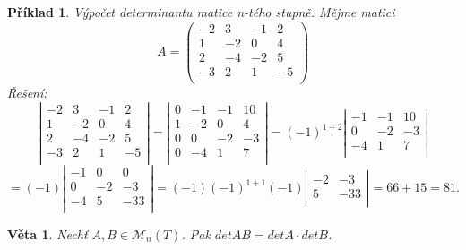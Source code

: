 \documentclass[12pt,a4paper]{article}
\newtheorem{sentence}{Věta}
\newtheorem{example}{Příklad}
\begin{document}
\begin{example}
	Výpočet determinantu matice n-tého stupně. Mějme matici $$A = \left( \begin{array}{cccc} -2 & 3 & -1 & 2\\ 1 & -2 & 0 & 4\\ 2 & -4 & -2 & 5\\ -3 & 2 & 1 & -5\\ \end{array} \right)$$
	Řešení: 
	\begin{displaymath}
		\left| 
		\begin{array}{cccc}
			-2 & 3 & -1 & 2\\ 
			1 & -2 & 0 & 4\\ 
			2 & -4 & -2 & 5\\ 
			-3 & 2 & 1 & -5\\
		\end{array} \right| = 
		\left| 
		\begin{array}{cccc}
			0 & -1 & -1 & 10\\ 
			1 & -2 & 0 & 4\\ 
			0 & 0 & -2 & -3\\ 
			0 & -4 & 1 & 7\\
		\end{array}\right| = (-1)^{1+2}
		\left| 
		\begin{array}{ccc}
			 -1 & -1 & 10\\ 
			 0 & -2 & -3\\ 
			 -4 & 1 & 7\\
		\end{array}\right| 
		\end{displaymath}
		\begin{displaymath}
		= (-1)
		\left| 
		\begin{array}{ccc}
			 -1 & 0 & 0 \\ 
			0 & -2 & -3 \\ 
			-4 & 5 & -33 \\ 
		\end{array}\right| = (-1)(-1)^{1+1}(-1) 
		\left| 
		\begin{array}{cc}
			 -2 & -3 \\ 
			 5 & -33 \\  
		\end{array}\right| = 66 + 15 = 81.
	\end{displaymath}
	
\end{example}

\begin{sentence}
	Nechť $A,B \in \mathscr{M}_n(T)$. Pak $detAB = detA \cdot detB$.
\end{sentence}
\end{document}
